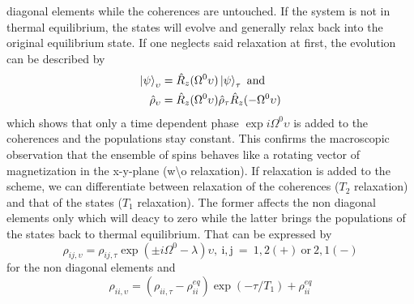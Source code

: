         diagonal elements while the coherences are untouched.
        If the system is not in thermal equilibrium, the states will evolve and generally relax back
        into the original equilibrium state. If one neglects said relaxation at first, the evolution
        can be described by 
        \begin{equation}
            \begin{split}
                \ket\psi_\upsilon &= \hat R_z(\Omega^0\upsilon)\ket\psi_\tau ~ \mathrm{and} \\
                \hat\rho_\upsilon &= \hat R_z(\Omega^0\upsilon)\hat\rho_\tau\hat
                R_z(-\Omega^0\upsilon)
            \end{split}
        \end{equation}
        which shows that only a time dependent phase $\exp{i\Omega^0 \upsilon}$ is added to the coherences and the populations
        stay constant. This confirms the macroscopic observation that the ensemble of spins behaves like a rotating vector of
        magnetization in the x-y-plane (w\textbackslash o relaxation).
        If relaxation is added to the scheme, we can differentiate between relaxation of the
        coherences ($T_2$ relaxation) and that of the states ($T_1$ relaxation). The former affects
        the non diagonal elements only which will deacy to zero while the latter brings the populations of the states back to
        thermal equilibrium. That can be expressed by
        \begin{equation}
            \rho_{ij, \upsilon} = \rho_{ij, \tau} \exp{(\pm
                i\Omega^0-\lambda)\upsilon},~\mathrm{i,j~=~
            1,2(+)~or~2,1(-)}
        \end{equation}
        for the non diagonal elements and
        \begin{equation}
            \rho_{ii,\upsilon} = (\rho_{ii,\tau} - \rho_{ii}^{eq})\exp(-\tau/T_1)+\rho_{ii}^{eq}
        \end{equation}
